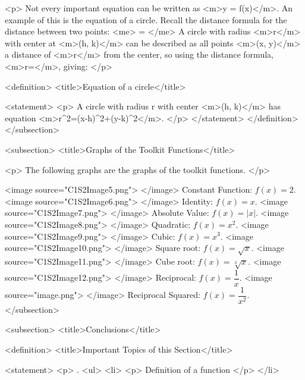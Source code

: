         <p>
            Not every important equation can be written as <m>y = f(x)</m>.
            An example of this is the equation of a circle.
            Recall the distance formula for the distance between two points:
            <me>
                =
            </me>
            A circle with radius <m>r</m> with center at <m>(h, k)</m> can be described as all points <m>(x, y)</m> a distance of <m>r</m> from the center, so using the distance formula, <m>r=</m>, giving:
        </p>

        <definition>
            <title>Equation of a circle</title>

            <statement>
                <p>
                    A circle with radius r with center <m>(h, k)</m> has equation <m>r^{2}=(x-h)^{2}+(y-k)^{2}</m>.
                </p>
            </statement>
        </definition>
    </subsection>


    <subsection>
        <title>Graphs of the Toolkit Functions</title>

        <p>
            The following graphs are the graphs of the toolkit functions.
        </p>

        <image source="C1S2Image5.png">
        </image>
        Constant Function: $f(x)=2$.
        <image source="C1S2Image6.png">
        </image>
        Identity: $f(x)=x$.
        <image source="C1S2Image7.png">
        </image>
        Absolute Value: $f(x)=|x|$.
        <image source="C1S2Image8.png">
        </image>
        Quadratic: $f(x)=x^{2}$.
        <image source="C1S2Image9.png">
        </image>
        Cubic: $f(x)=x^{3}$.
        <image source="C1S2Image10.png">
        </image>
        Square root: $f(x)=\sqrt{x}$.
        <image source="C1S2Image11.png">
        </image>
        Cube root: $f(x)=\sqrt[3]{x}$.
        <image source="C1S2Image12.png">
        </image>
        Reciprocal: $f(x)=\dfrac{1}{x}$.
        <image source="image.png">
        </image>
        Reciprocal Squared: $f(x)=\dfrac{1}{x^2}$.
    </subsection>


    <subsection>
        <title>Conclusions</title>

        <definition>
            <title>Important Topics of this Section</title>

            <statement>
                <p>
                    .
                    <ul>
                        <li>
                            <p>
                                Definition of a function
                            </p>
                        </li>

